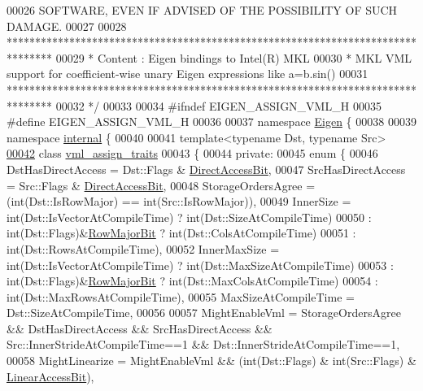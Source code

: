 \begin{DoxyCode}
00026 \textcolor{comment}{ SOFTWARE, EVEN IF ADVISED OF THE POSSIBILITY OF SUCH DAMAGE.}
00027 \textcolor{comment}{}
00028 \textcolor{comment}{ ********************************************************************************}
00029 \textcolor{comment}{ *   Content : Eigen bindings to Intel(R) MKL}
00030 \textcolor{comment}{ *   MKL VML support for coefficient-wise unary Eigen expressions like a=b.sin()}
00031 \textcolor{comment}{ ********************************************************************************}
00032 \textcolor{comment}{*/}
00033 
00034 \textcolor{preprocessor}{#ifndef EIGEN\_ASSIGN\_VML\_H}
00035 \textcolor{preprocessor}{#define EIGEN\_ASSIGN\_VML\_H}
00036 
00037 \textcolor{keyword}{namespace }\hyperlink{namespace_eigen}{Eigen} \{ 
00038 
00039 \textcolor{keyword}{namespace }\hyperlink{namespaceinternal}{internal} \{
00040 
00041 \textcolor{keyword}{template}<\textcolor{keyword}{typename} Dst, \textcolor{keyword}{typename} Src>
\hyperlink{class_eigen_1_1internal_1_1vml__assign__traits}{00042} \textcolor{keyword}{class }\hyperlink{class_eigen_1_1internal_1_1vml__assign__traits}{vml\_assign\_traits}
00043 \{
00044   \textcolor{keyword}{private}:
00045     \textcolor{keyword}{enum} \{
00046       DstHasDirectAccess = Dst::Flags & \hyperlink{group__flags_gabf1e9d0516a933445a4c307ad8f14915}{DirectAccessBit},
00047       SrcHasDirectAccess = Src::Flags & \hyperlink{group__flags_gabf1e9d0516a933445a4c307ad8f14915}{DirectAccessBit},
00048       StorageOrdersAgree = (int(Dst::IsRowMajor) == int(Src::IsRowMajor)),
00049       InnerSize = \textcolor{keywordtype}{int}(Dst::IsVectorAtCompileTime) ? int(Dst::SizeAtCompileTime)
00050                 : int(Dst::Flags)&\hyperlink{group__flags_gae4f56c2a60bbe4bd2e44c5b19cbe8762}{RowMajorBit} ? int(Dst::ColsAtCompileTime)
00051                 : int(Dst::RowsAtCompileTime),
00052       InnerMaxSize  = int(Dst::IsVectorAtCompileTime) ? int(Dst::MaxSizeAtCompileTime)
00053                     : int(Dst::Flags)&\hyperlink{group__flags_gae4f56c2a60bbe4bd2e44c5b19cbe8762}{RowMajorBit} ? int(Dst::MaxColsAtCompileTime)
00054                     : int(Dst::MaxRowsAtCompileTime),
00055       MaxSizeAtCompileTime = Dst::SizeAtCompileTime,
00056 
00057       MightEnableVml = StorageOrdersAgree && DstHasDirectAccess && SrcHasDirectAccess && 
      Src::InnerStrideAtCompileTime==1 && Dst::InnerStrideAtCompileTime==1,
00058       MightLinearize = MightEnableVml && (int(Dst::Flags) & int(Src::Flags) & 
      \hyperlink{group__flags_ga4b983a15d57cd55806df618ac544d09e}{LinearAccessBit}),

\end{DoxyCode}
